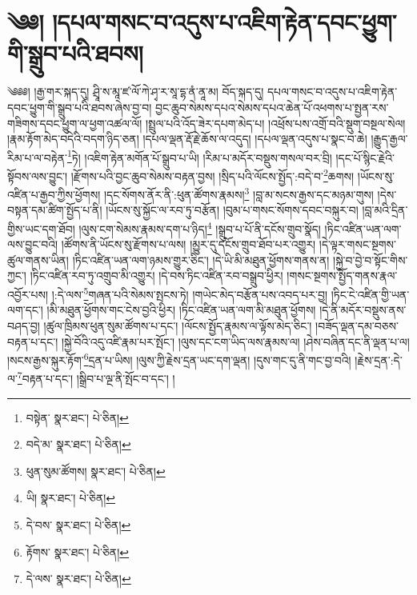 \setcounter{footnote}{0} 
\chapter{༄༅། །དཔལ་གསང་བ་འདུས་པ་འཇིག་རྟེན་དབང་ཕྱུག་གི་སྒྲུབ་པའི་ཐབས།}༄༅༅། །རྒྱ་གར་སྐད་དུ། ཤྲཱི་ས་མཱ་ཛ་ལོ་ཀེ་ཤྭ་ར་སཱ་དྷ་ནཾ་ནཱ་མ། བོད་སྐད་དུ། དཔལ་གསང་བ་འདུས་པ་འཇིག་རྟེན་དབང་ཕྱུག་གི་སྒྲུབ་པའི་ཐབས་ཞེས་བྱ་བ། བྱང་ཆུབ་སེམས་དཔའ་སེམས་དཔའ་ཆེན་པོ་འཕགས་པ་སྤྱན་རས་གཟིགས་དབང་ཕྱུག་ལ་ཕྱག་འཚལ་ལོ། །སྤྲུལ་པའི་འོད་ཟེར་དཔག་མེད་པ། །འཕྲོས་པས་འགྲོ་བའི་སྡུག་བསྔལ་སེལ། །རྣམ་རྟོག་མེད་བདེའི་བདག་ཉིད་ཅན། །དཔལ་ལྡན་རྡོ་རྗེ་ཆོས་ལ་འདུད། །དཔལ་ལྡན་འདུས་པ་སྣང་བ་ཆེ། །རྒྱུད་རྒྱལ་རིམ་པ་ལ་བརྟེན་\footnote{བསྟེན་  སྣར་ཐང་།  པེ་ཅིན། }ཏེ། །འཇིག་རྟེན་མགོན་པོ་སྒྲུབ་པ་ཡི། །རིམ་པ་མདོར་བསྡུས་གསལ་བར་བྲི། །དང་པོ་སྙིང་རྗེའི་སྟོབས་ལས་བྱུང་། །རྫོགས་པའི་བྱང་ཆུབ་སེམས་བརྟན་བྱས། །སྲིད་པའི་ལོངས་སྤྱོད་:བདེ་བ་\footnote{བདེ་མ་  སྣར་ཐང་།  པེ་ཅིན། }ཆགས། །ཡོངས་སུ་འཛིན་པ་རྒྱབ་ཀྱིས་ཕྱོགས། །དང་སོགས་ནོར་ནི་:ཕུན་ཚོགས་རྣམས།\footnote{ཕུན་སུམ་ཚོགས།  སྣར་ཐང་།  པེ་ཅིན། } །བླ་མ་སངས་རྒྱས་དང་མཉམ་གུས། །དེས་བསྟན་དམ་ཚིག་སྤྱོད་པ་ནི། །ཡོངས་སུ་སྐྱོང་ལ་རབ་ཏུ་བརྩོན། །བུམ་པ་གསང་སོགས་དབང་བསྐུར་བ། །བླ་མའི་དྲིན་གྱིས་ཡང་དག་ཐོབ། །ལུས་ངག་སེམས་རྣམས་དག་པ་ཉིད།\footnote{ཡི།  སྣར་ཐང་།  པེ་ཅིན། } །སྒྲུབ་པ་པོ་ནི་དངོས་གྲུབ་སྣོད། །ཏིང་འཛིན་ཡན་ལག་ལས་བྱུང་བའི། །ཚོགས་ནི་ཡོངས་སུ་རྫོགས་པ་ལས། །མྱུར་དུ་དངོས་གྲུབ་ཐོབ་པར་འགྱུར། །དེ་ལྟར་གསང་སྔགས་ཚུལ་གནས་ཡིན། །ཏིང་འཛིན་ཡན་ལག་ཉམས་གྱུར་ཅིང་། །དེ་ཡི་མི་མཐུན་ཕྱོགས་གནས་ན། །སྐྱེ་བ་བྱེ་བ་སྟོང་གིས་ཀྱང་། །ཏིང་འཛིན་རབ་ཏུ་འགྲུབ་མི་འགྱུར། །དེ་བས་ཏིང་འཛིན་རབ་བསྒྲུབ་ཕྱིར། །གསང་སྔགས་སྤྱོད་གནས་རྣལ་འབྱོར་པས། །:དེ་ལས་\footnote{དེ་བས་  སྣར་ཐང་།  པེ་ཅིན། }གཞན་པའི་སེམས་སྤངས་ཏེ། །གཡེང་མེད་བརྩོན་པས་འབད་པར་བྱ། །ཏིང་ངེ་འཛིན་གྱི་ཡན་ལག་དང་། །མི་མཐུན་ཕྱོགས་གང་ངེས་བྱའི་ཕྱིར། །ཏིང་འཛིན་ཡན་ལག་མི་མཐུན་ཕྱོགས། །དེ་ནི་མདོར་བསྡུས་ནས་བཤད་བྱ། །ཚུལ་ཁྲིམས་ཕུན་སུམ་ཚོགས་པ་དང་། །ལོངས་སྤྱོད་རྣམས་ལ་ལྟོས་མེད་ཅིང་། །བཟོད་ལྡན་དམ་བཅས་བརྟན་པ་དང་། །སྐྱེ་བོའི་འདུ་འཛི་རྣམ་པར་སྤོང་། །ལུས་དང་ངག་ཡིད་ལས་རྣམས་ལ། །ཤེས་བཞིན་དང་ནི་ལྡན་པ་ལ། །སངས་རྒྱས་སྐུར་རྟོག་\footnote{རྟོགས་  སྣར་ཐང་།  པེ་ཅིན། }དྲན་པ་ཡིས། །ལུས་ཀྱི་རྗེས་དྲན་ཡང་དག་ལྡན། །དུས་གང་དུ་ནི་གང་བྱ་བའི། །རྗེས་དྲན་:དེ་ལ་\footnote{དེ་ལས་  སྣར་ཐང་།  པེ་ཅིན། }བརྟན་པ་དང་། །སྒྲིབ་པ་ལྔ་ནི་སྤོང་བ་དང་། །
